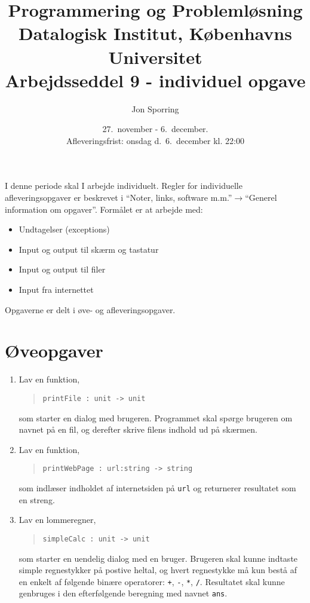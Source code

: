 \documentclass[a4paper,12pt]{article}
\title{Programmering og Problemløsning\\Datalogisk Institut,
  Københavns Universitet\\Arbejdsseddel 9 - individuel opgave}
\author{Jon Sporring}
\date{27.\ november - 6.\ december.\\Afleveringsfrist: onsdag d.\ 6.\ december kl. 22:00}
\begin{document}
\maketitle

I denne periode skal I arbejde individuelt. Regler for individuelle afleveringsopgaver er beskrevet i "`Noter, links, software m.m."'$\rightarrow$"`Generel information om opgaver"'. Formålet er at arbejde med:
\begin{itemize}
\item Undtagelser (exceptions)
\item Input og output til skærm og tastatur
\item Input og output til filer
\item Input fra internettet
\end{itemize}

Opgaverne er delt i øve- og afleveringsopgaver. 

\section*{Øveopgaver}
\begin{enumerate}[label=9ø.\arabic*,start=0]
<\item Lav en funktion,
  \begin{quote}
    \mbox{\lstinline!printFile : unit -> unit!}
  \end{quote}
  som starter en dialog med brugeren. Programmet skal spørge brugeren om navnet på en fil, og derefter skrive filens indhold ud på skærmen.
\item Lav en funktion, 
  \begin{quote}
    \mbox{\lstinline!printWebPage : url:string -> string!}
  \end{quote}
  som indlæser indholdet af internetsiden på \lstinline!url! og returnerer resultatet som en streng.
\item Lav en lommeregner,
  \begin{quote}
    \mbox{\lstinline!simpleCalc : unit -> unit!}
  \end{quote}
  som starter en uendelig dialog med en bruger. Brugeren skal kunne indtaste simple regnestykker på postive heltal, og hvert regnestykke må kun bestå af en enkelt af følgende binære operatorer: \lstinline!+!, \lstinline!-!, \lstinline!*!, \lstinline!/!. Resultatet skal kunne genbruges i den efterfølgende beregning med navnet \lstinline!ans!.
\end{enumerate}
\end{document}
